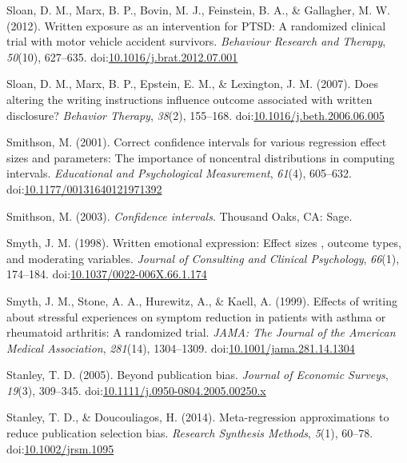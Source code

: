 \documentclass[man, mask]{apa6}
\theoremstyle{definition}
\theoremstyle{definition}
\theoremstyle{definition}
\theoremstyle{remark}
\begin{document}
\hypertarget{ref-Sloan2012}{}
Sloan, D. M., Marx, B. P., Bovin, M. J., Feinstein, B. A., \& Gallagher,
M. W. (2012). Written exposure as an intervention for PTSD: A randomized
clinical trial with motor vehicle accident survivors. \emph{Behaviour
Research and Therapy}, \emph{50}(10), 627--635.
doi:\href{https://doi.org/10.1016/j.brat.2012.07.001}{10.1016/j.brat.2012.07.001}

\hypertarget{ref-Sloan2007}{}
Sloan, D. M., Marx, B. P., Epstein, E. M., \& Lexington, J. M. (2007).
Does altering the writing instructions influence outcome associated with
written disclosure? \emph{Behavior Therapy}, \emph{38}(2), 155--168.
doi:\href{https://doi.org/10.1016/j.beth.2006.06.005}{10.1016/j.beth.2006.06.005}

\hypertarget{ref-Smithson2001}{}
Smithson, M. (2001). Correct confidence intervals for various regression
effect sizes and parameters: The importance of noncentral distributions
in computing intervals. \emph{Educational and Psychological
Measurement}, \emph{61}(4), 605--632.
doi:\href{https://doi.org/10.1177/00131640121971392}{10.1177/00131640121971392}

\hypertarget{ref-Smithson2003}{}
Smithson, M. (2003). \emph{Confidence intervals}. Thousand Oaks, CA:
Sage.

\hypertarget{ref-Smyth1998}{}
Smyth, J. M. (1998). Written emotional expression: Effect sizes ,
outcome types, and moderating variables. \emph{Journal of Consulting and
Clinical Psychology}, \emph{66}(1), 174--184.
doi:\href{https://doi.org/10.1037/0022-006X.66.1.174}{10.1037/0022-006X.66.1.174}

\hypertarget{ref-Smyth1999}{}
Smyth, J. M., Stone, A. A., Hurewitz, A., \& Kaell, A. (1999). Effects
of writing about stressful experiences on symptom reduction in patients
with asthma or rheumatoid arthritis: A randomized trial. \emph{JAMA: The
Journal of the American Medical Association}, \emph{281}(14),
1304--1309.
doi:\href{https://doi.org/10.1001/jama.281.14.1304}{10.1001/jama.281.14.1304}

\hypertarget{ref-Stanley2005}{}
Stanley, T. D. (2005). Beyond publication bias. \emph{Journal of
Economic Surveys}, \emph{19}(3), 309--345.
doi:\href{https://doi.org/10.1111/j.0950-0804.2005.00250.x}{10.1111/j.0950-0804.2005.00250.x}

\hypertarget{ref-Stanley2014}{}
Stanley, T. D., \& Doucouliagos, H. (2014). Meta-regression
approximations to reduce publication selection bias. \emph{Research
Synthesis Methods}, \emph{5}(1), 60--78.
doi:\href{https://doi.org/10.1002/jrsm.1095}{10.1002/jrsm.1095}
\end{document}
